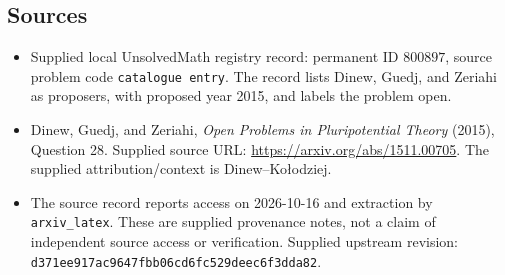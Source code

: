 \documentclass[11pt]{article}
\begin{document}
\subsection{Sources}
\begin{itemize}
\item Supplied local UnsolvedMath registry record: permanent ID \(800897\), source problem code \texttt{catalogue entry}. The record lists Dinew, Guedj, and Zeriahi as proposers, with proposed year 2015, and labels the problem open.
\item Dinew, Guedj, and Zeriahi, \emph{Open Problems in Pluripotential Theory} (2015), Question 28. Supplied source URL: \url{https://arxiv.org/abs/1511.00705}. The supplied attribution/context is Dinew--Ko\l{}odziej.
\item The source record reports access on 2026-10-16 and extraction by \texttt{arxiv\_latex}. These are supplied provenance notes, not a claim of independent source access or verification. Supplied upstream revision: \texttt{d371ee917ac9647fbb06cd6fc529deec6f3dda82}.
\end{itemize}
\end{document}

